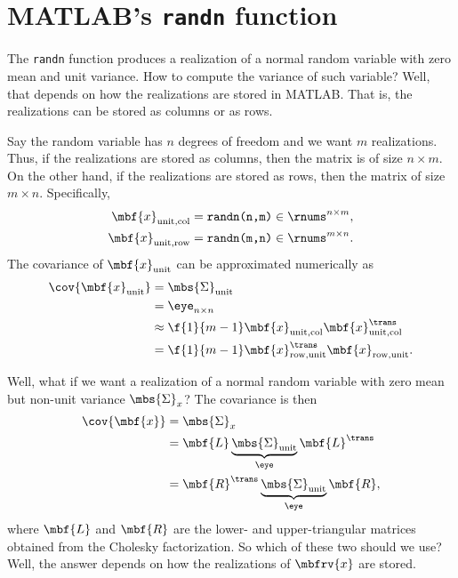 \section{MATLAB's \texttt{randn} function}
The \texttt{randn} function produces a realization of a normal random variable with zero mean and unit variance. How to compute the variance of such variable? Well, that depends on how the realizations are stored in MATLAB. That is, the realizations can be stored as columns or as rows. 

Say the random variable has $n$ degrees of freedom and we want $m$ realizations. Thus, if the realizations are stored as columns, then the matrix is of size $n\times m$. On the other hand, if the realizations are stored as rows, then the matrix of size $m\times n$. Specifically,
\begin{align}
    \mbf{x}_{\mathrm{unit, col}} &= \texttt{randn(n,m)}\in\rnums^{n\times m},\\
    \mbf{x}_{\mathrm{unit, row}} &= \texttt{randn(m,n)}\in\rnums^{m\times n}.
\end{align}
The covariance of $\mbf{x}_{\mathrm{unit}}$ can be approximated numerically as
\begin{align}
    \cov{\mbf{x}_{\mathrm{unit}}} 
    &= \mbs{\Sigma}_{\mathrm{unit}}\\
    &= \eye_{n\times n}\\
    \label{eq:unit covariance col. realizations}
    &\approx \f{1}{m-1}\mbf{x}_{\mathrm{unit, col}}\mbf{x}_{\mathrm{unit, col}}^{\trans}\\
    \label{eq:unit covariance row. realizations}
    &= \f{1}{m-1}\mbf{x}_{\mathrm{row, unit}}^{\trans}\mbf{x}_{\mathrm{row, unit}}.
\end{align}

Well, what if we want a realization of a normal random variable with zero mean but non-unit variance $\mbs{\Sigma}_{x}$? The covariance is then
\begin{align}
    \cov{\mbf{x}} 
    &= \mbs{\Sigma}_{x}\\
    &= \mbf{L}\underbrace{\mbs{\Sigma}_{\mathrm{unit}}}_{\eye}\mbf{L}^{\trans}\\
    &= \mbf{R}^{\trans}\underbrace{\mbs{\Sigma}_{\mathrm{unit}}}_{\eye}\mbf{R},
\end{align}
where $\mbf{L}$ and $\mbf{R}$ are the lower- and upper-triangular matrices obtained from the Cholesky factorization. So which of these two should we use? Well, the answer depends on how the realizations of $\mbfrv{x}$ are stored. 


